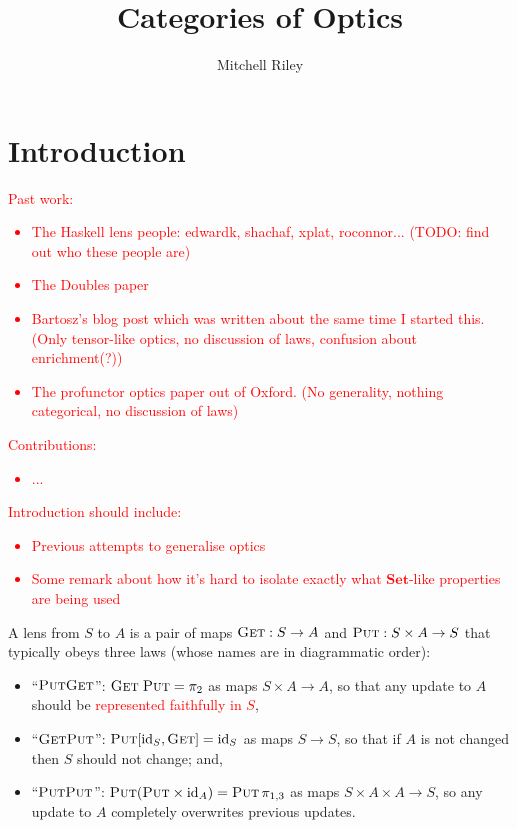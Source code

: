 \documentclass[11pt,a4paper]{article}
\title{Categories of Optics}
\author{Mitchell Riley}
\affil{Wesleyan University \\ \texttt{mvriley@wesleyan.edu}}
\theoremstyle{plain}
\theoremstyle{definition}
\newcommand{\Set}{\mathbf{Set}}
\newcommand{\id}{\mathrm{id}}
\newcommand{\fget}{\textsc{Get}}
\newcommand{\fput}{\textsc{Put}}
\newcommand{\todo}[1]{\textcolor{red}{\small #1}}
\begin{document}
\maketitle

\section{Introduction}

\todo{Past work:
\begin{itemize}
\item The Haskell lens people: edwardk, shachaf, xplat, roconnor... (TODO: find out who these people are)
\item The Doubles paper
\item Bartosz's blog post which was written about the same time I started this. (Only tensor-like optics, no discussion of laws, confusion about enrichment(?))
\item The profunctor optics paper out of Oxford. (No generality, nothing categorical, no discussion of laws)
\end{itemize}
}

\todo{Contributions:
\begin{itemize}
\item ...
\end{itemize}
}

\todo{Introduction should include:
\begin{itemize}
\item Previous attempts to generalise optics
\item Some remark about how it's hard to isolate exactly what $\Set$-like properties are being used
\end{itemize}
}
A lens from $S$ to $A$ is a pair of maps $\fget : S \to A$ and $\fput : S \times A \to S$ that typically obeys three laws (whose names are in diagrammatic order):
\begin{itemize}
\item ``$\fput\fget$'': $\fget \; \fput = \pi_2$ as maps $S \times A \to A$, so that any update to $A$ should be \todo{represented faithfully in $S$},
\item ``$\fget\fput$'': $\fput [\id_S, \fget] = \id_S$ as maps $S \to S$, so that if $A$ is not changed then $S$ should not change; and,
\item ``$\fput\fput$'': $\fput (\fput \times \id_A) = \fput \, \pi_{1, 3}$ as maps $S \times A \times A \to S$, so any update to $A$ completely overwrites previous updates.
\end{itemize}
\end{document}

